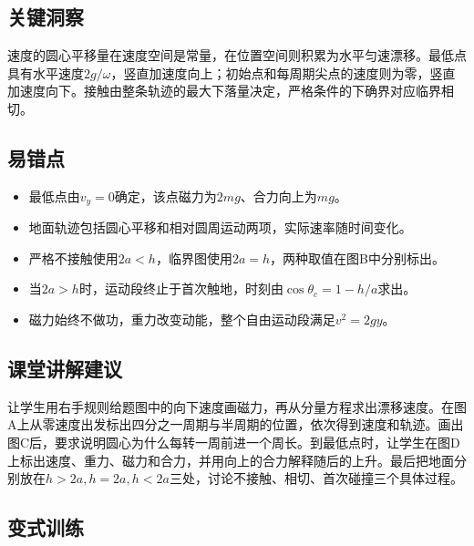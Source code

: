 \documentclass[UTF8,fontset=fandol,a4paper,11pt]{ctexart}
\begin{document}


\subsection*{关键洞察}

速度的圆心平移量在速度空间是常量，在位置空间则积累为水平匀速漂移。最低点具有水平速度$2g/\omega$，竖直加速度向上；初始点和每周期尖点的速度则为零，竖直加速度向下。接触由整条轨迹的最大下落量决定，严格条件的下确界对应临界相切。



\subsection*{易错点}

\begin{itemize}
\item 最低点由$v_y=0$确定，该点磁力为$2mg$、合力向上为$mg$。
\item 地面轨迹包括圆心平移和相对圆周运动两项，实际速率随时间变化。
\item 严格不接触使用$2a<h$，临界图使用$2a=h$，两种取值在图B中分别标出。
\item 当$2a>h$时，运动段终止于首次触地，时刻由$\cos\theta_c=1-h/a$求出。
\item 磁力始终不做功，重力改变动能，整个自由运动段满足$v^2=2gy$。
\end{itemize}



\subsection*{课堂讲解建议}

让学生用右手规则给题图中的向下速度画磁力，再从分量方程求出漂移速度。在图A上从零速度出发标出四分之一周期与半周期的位置，依次得到速度和轨迹。画出图C后，要求说明圆心为什么每转一周前进一个周长。到最低点时，让学生在图D上标出速度、重力、磁力和合力，并用向上的合力解释随后的上升。最后把地面分别放在$h>2a,h=2a,h<2a$三处，讨论不接触、相切、首次碰撞三个具体过程。



\subsection*{变式训练}
\end{document}
